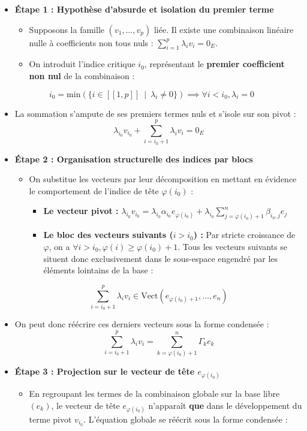 \documentclass[11pt, a4paper]{article}
\theoremstyle{definition}
\begin{document}
\begin{itemize}
\item \textbf{Étape 1 : Hypothèse d'absurde et isolation du premier terme}
\begin{itemize}
\item Supposons la famille $(v_1, \dots, v_p)$ liée. Il existe une combinaison linéaire nulle à coefficients non tous nuls : $\sum_{i=1}^p \lambda_i v_i = 0_E$.
\item On introduit l'indice critique $i_0$, représentant le \textbf{premier coefficient non nul} de la combinaison :
\end{itemize}
\end{itemize}
\[
i_0 = \mathrm{min}(\{i \in [\![1, p]\!] ~\mid~ \lambda_i \neq 0\}) \implies \forall i < i_0, \lambda_i = 0
\]
\begin{itemize}
\item La sommation s'ampute de ses premiers termes nuls et s'isole sur son pivot :
\[
\lambda_{i_0} v_{i_0} + \sum_{i=i_0+1}^p \lambda_i v_i = 0_E
\]
\item \textbf{Étape 2 : Organisation structurelle des indices par blocs}
\begin{itemize}
\item On substitue les vecteurs par leur décomposition en mettant en évidence le comportement de l'indice de tête $\varphi(i_0)$ :
\begin{itemize}
\item \textbf{Le vecteur pivot :} $\lambda_{i_0} v_{i_0} = \lambda_{i_0} \alpha_{i_0} e_{\varphi(i_0)} + \lambda_{i_0} \sum_{j=\varphi(i_0)+1}^n \beta_{i_0,j} e_j$
\item \textbf{Le bloc des vecteurs suivants ($i > i_0$) :} Par stricte croissance de $\varphi$, on a $\forall i > i_0, \varphi(i) \ge \varphi(i_0)+1$. Tous les vecteurs suivants se situent donc exclusivement dans le sous-espace engendré par les éléments lointains de la base :
\end{itemize}
\end{itemize}
\[
\sum_{i=i_0+1}^p \lambda_i v_i \in \text{Vect}\left(e_{\varphi(i_0)+1}, \dots, e_n\right)
\]
\item On peut donc réécrire ces derniers vecteurs sous la forme condensée :
\[
\sum_{i=i_0+1}^p \lambda_i v_i = \sum_{k=\varphi(i_0)+1}^n \Gamma_k e_k
\]
\end{itemize}
\begin{itemize}
\item \textbf{Étape 3 : Projection sur le vecteur de tête $e_{\varphi(i_0)}$}
\begin{itemize}
\item En regroupant les termes de la combinaison globale sur la base libre $(e_k)$, le vecteur de tête $e_{\varphi(i_0)}$ n'apparaît \textbf{que} dans le développement du terme pivot $v_{i_0}$. L'équation globale se réécrit sous la forme condensée :
\end{itemize}
\end{itemize}
\end{document}
